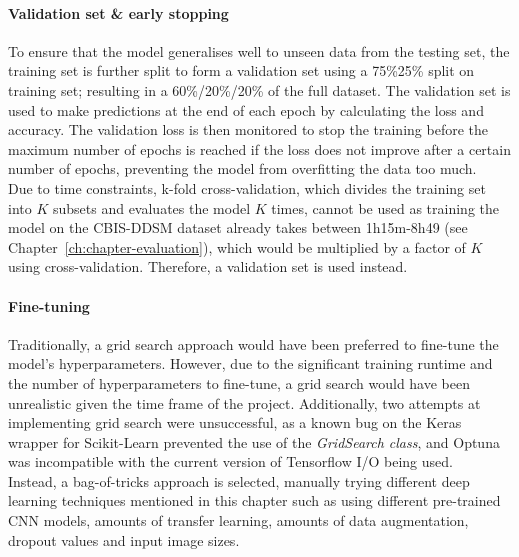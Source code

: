 \paragraph{Validation set \& early stopping}
\label{sec:design-validation-early-stopping}

To ensure that the model generalises well to unseen  data from the testing set, the training set is further split to form a validation set using a 75\%25\% split on training set; resulting in a 60\%/20\%/20\% of the full dataset. The validation set is used to make predictions at the end of each epoch by calculating the loss and accuracy. The validation loss is then monitored to stop the training before the maximum number of epochs is reached if the loss does not improve after a certain number of epochs, preventing the model from overfitting the data too much.\\

Due to time constraints, k-fold cross-validation, which divides the training set into $K$ subsets and evaluates the model $K$ times, cannot be used as training the model on the CBIS-DDSM dataset already takes between 1h15m-8h49 (see Chapter~\ref{ch:chapter-evaluation}), which would be multiplied by a factor of $K$ using cross-validation. Therefore, a validation set is used instead.

\paragraph{Fine-tuning}
\label{sec:design-fine-tuning-bagoftricks}

Traditionally, a grid search approach would have been preferred to fine-tune the model's hyperparameters. However, due to the significant training runtime and the number of hyperparameters to fine-tune, a grid search would have been unrealistic given the time frame of the project. Additionally, two attempts at implementing grid search were unsuccessful, as a known bug on the Keras wrapper for Scikit-Learn prevented the use of the \textit{GridSearch class}, and Optuna was incompatible with the current version of Tensorflow I/O being used.\\

Instead, a bag-of-tricks approach is selected, manually trying different deep learning techniques mentioned in this chapter such as using different pre-trained CNN models, amounts of transfer learning, amounts of data augmentation, dropout values and input image sizes.

